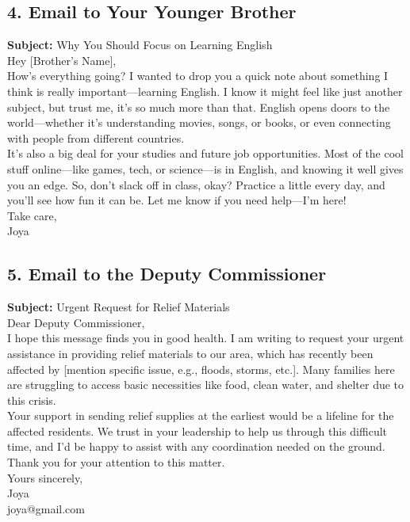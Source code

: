\documentclass{article}
\begin{document}
\subsection*{4. Email to Your Younger Brother}
\textbf{Subject:} Why You Should Focus on Learning English \\
Hey [Brother’s Name], \\
How’s everything going? I wanted to drop you a quick note about something I think is really important—learning English. I know it might feel like just another subject, but trust me, it’s so much more than that. English opens doors to the world—whether it’s understanding movies, songs, or books, or even connecting with people from different countries. \\
It’s also a big deal for your studies and future job opportunities. Most of the cool stuff online—like games, tech, or science—is in English, and knowing it well gives you an edge. So, don’t slack off in class, okay? Practice a little every day, and you’ll see how fun it can be. Let me know if you need help—I’m here! \\
Take care, \\
Joya \\
\subsection*{5. Email to the Deputy Commissioner}
\textbf{Subject:} Urgent Request for Relief Materials \\
Dear Deputy Commissioner, \\
I hope this message finds you in good health. I am writing to request your urgent assistance in providing relief materials to our area, which has recently been affected by [mention specific issue, e.g., floods, storms, etc.]. Many families here are struggling to access basic necessities like food, clean water, and shelter due to this crisis. \\
Your support in sending relief supplies at the earliest would be a lifeline for the affected residents. We trust in your leadership to help us through this difficult time, and I’d be happy to assist with any coordination needed on the ground. \\
Thank you for your attention to this matter. \\
Yours sincerely, \\
Joya \\
joya@gmail.com \\
\end{document}
